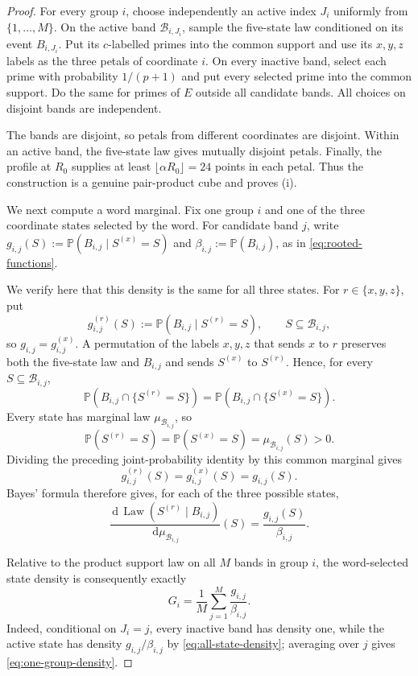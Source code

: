 \documentclass[11pt]{article}
\numberwithin{equation}{section}
\theoremstyle{plain}
\newcommand{\Pp}{\mathbb P}
\newcommand{\1}{\mathbf 1}
\newcommand{\dd}{\,\mathrm d}
\newcommand{\cB}{\mathcal B}
\begin{document}
\begin{proof}
For every group $i$, choose independently an active index
$J_i$ uniformly from $\{1,\ldots,M\}$.  On the active band
$\cB_{i,J_i}$, sample the five-state law conditioned on its event
$B_{i,J_i}$.
Put its $c$-labelled primes into the common support and use its
$x,y,z$ labels as the three petals of coordinate $i$.  On every inactive
band, select each prime with probability $1/(p+1)$ and put every selected
prime into the common support.  Do the same for primes of $E$ outside all
candidate bands.  All choices on disjoint bands are independent.

The bands are disjoint, so petals from different coordinates are disjoint.
Within an active band, the five-state law gives mutually disjoint petals.
Finally, the profile at $R_0$ supplies at least
$\lfloor\alpha R_0\rfloor=24$ points in each petal.  Thus the construction
is a genuine pair-product cube and proves (i).

We next compute a word marginal.  Fix one group $i$ and one of the three
coordinate states selected by the word.  For candidate band $j$, write
$g_{i,j}(S):=\Pp(B_{i,j}\mid S^{(x)}=S)$ and
$\beta_{i,j}:=\Pp(B_{i,j})$, as in
\eqref{eq:rooted-functions}.

We verify here that this density is the same for all three states.  For
$r\in\{x,y,z\}$, put
\[
 g_{i,j}^{(r)}(S)
 :=\Pp(B_{i,j}\mid S^{(r)}=S),
 \qquad S\subseteq\cB_{i,j},
\]
so $g_{i,j}=g_{i,j}^{(x)}$.  A permutation of the labels $x,y,z$ that
sends $x$ to $r$ preserves both the five-state law and $B_{i,j}$ and sends
$S^{(x)}$ to $S^{(r)}$.  Hence, for every
$S\subseteq\cB_{i,j}$,
\[
 \Pp(B_{i,j}\cap\{S^{(r)}=S\})
 =\Pp(B_{i,j}\cap\{S^{(x)}=S\}).
\]
Every state has marginal law $\mu_{\cB_{i,j}}$, so
\[
 \Pp(S^{(r)}=S)=\Pp(S^{(x)}=S)
 =\mu_{\cB_{i,j}}(S)>0.
\]
Dividing the preceding joint-probability identity by this common marginal
gives
\[
 g_{i,j}^{(r)}(S)=g_{i,j}^{(x)}(S)=g_{i,j}(S).
\]
Bayes' formula therefore gives, for each of the three possible states,
\begin{equation}\label{eq:all-state-density}
 \frac{\dd\,\operatorname{Law}(S^{(r)}\mid B_{i,j})}
      {\dd\mu_{\cB_{i,j}}}(S)
 =\frac{g_{i,j}(S)}{\beta_{i,j}}.
\end{equation}

Relative to the product support law on all $M$ bands in group $i$, the
word-selected state density is consequently exactly
\begin{equation}\label{eq:one-group-density}
 G_i=\frac1M\sum_{j=1}^M\frac{g_{i,j}}{\beta_{i,j}}.
\end{equation}
Indeed, conditional on $J_i=j$, every inactive band has density one, while
the active state has density $g_{i,j}/\beta_{i,j}$ by
\eqref{eq:all-state-density}; averaging over $j$ gives
\eqref{eq:one-group-density}.


\end{proof}
\end{document}
